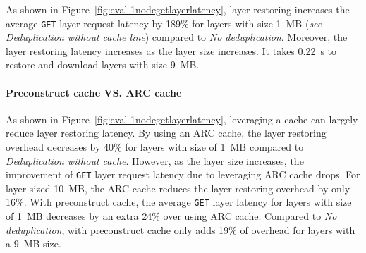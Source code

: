 As shown in Figure~\ref{fig:eval-1nodegetlayerlatency}, layer restoring increases the average \texttt{GET} layer request latency by 189\% for layers with size 1~MB (\emph{see Deduplication without cache line}) compared to \emph{No deduplication}.
Moreover, the layer restoring latency increases as the layer size increases.
It takes 0.22~s to restore and download layers with size 9~MB.

\paragraph{Preconstruct cache VS. ARC cache}
As shown in Figure~\ref{fig:eval-1nodegetlayerlatency}, 
leveraging a cache can largely reduce layer restoring latency.
By using an ARC cache, the layer restoring overhead decreases by 40\% for layers with size of 1~MB compared to \emph{Deduplication without cache}.
However, as the layer size increases, the improvement of \texttt{GET} layer request latency due to leveraging ARC cache drops.
For layer sized 10~MB, the ARC cache reduces the layer restoring overhead by only 16\%. 
With \sysname preconstruct cache, the average \texttt{GET} layer latency for layers with size of 1~MB decreases by an extra 24\% over using ARC cache.
Compared to \emph{No deduplication}, \sysname with preconstruct cache only adds 19\% of overhead for layers with a 9~MB size. 

